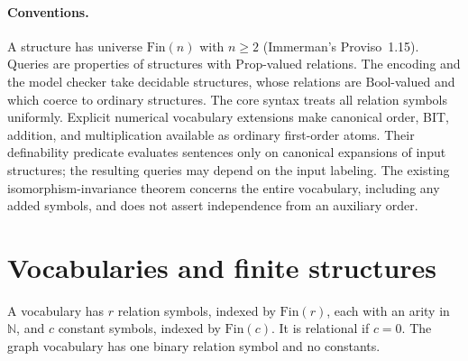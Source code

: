 \paragraph{Conventions.} A structure has universe $\mathrm{Fin}(n)$ with
$n \ge 2$ (Immerman's Proviso~1.15). Queries are properties of structures with
$\mathrm{Prop}$-valued relations. The encoding and the model checker take
decidable structures, whose relations are $\mathrm{Bool}$-valued and which coerce
to ordinary structures. The core syntax treats all relation symbols uniformly.
Explicit numerical vocabulary extensions make canonical order, BIT, addition,
and multiplication available as ordinary first-order atoms. Their definability
predicate evaluates sentences only on canonical expansions of input structures;
the resulting queries may depend on the input labeling. The existing
isomorphism-invariance theorem concerns the entire vocabulary, including any
added symbols, and does not assert independence from an auxiliary order.

\section{Vocabularies and finite structures}

\begin{definition}[Vocabulary]
  \label{def:desc-vocabulary}
  \leanok
  A vocabulary has $r$ relation symbols, indexed by $\mathrm{Fin}(r)$, each with
  an arity in $\mathbb{N}$, and $c$ constant symbols, indexed by
  $\mathrm{Fin}(c)$. It is relational if $c = 0$. The graph vocabulary has one
  binary relation symbol and no constants.
\end{definition}

